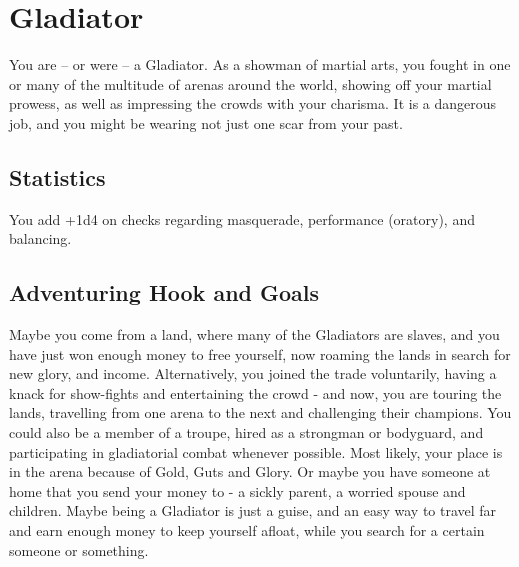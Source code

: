 \section{Gladiator}\label{background:gladiator}
You are -- or were -- a Gladiator.
As a showman of martial arts, you fought in one or many of the multitude of arenas around the world, showing off your martial prowess, as well as impressing the crowds with your charisma.
It is a dangerous job, and you might be wearing not just one scar from your past.

\subsection{Statistics}
You add +1d4 on checks regarding masquerade, performance (oratory), and balancing.

\subsection{Adventuring Hook and Goals}
Maybe you come from a land, where many of the Gladiators are slaves, and you have just won enough money to free yourself, now roaming the lands in search for new glory, and income.
Alternatively, you joined the trade voluntarily, having a knack for show-fights and entertaining the crowd - and now, you are touring the lands, travelling from one arena to the next and challenging their champions.
You could also be a member of a troupe, hired as a strongman or bodyguard, and participating in gladiatorial combat whenever possible.
Most likely, your place is in the arena because of Gold, Guts and Glory.
Or maybe you have someone at home that you send your money to - a sickly parent, a worried spouse and children.
Maybe being a Gladiator is just a guise, and an easy way to travel far and earn enough money to keep yourself afloat, while you search for a certain someone or something.
